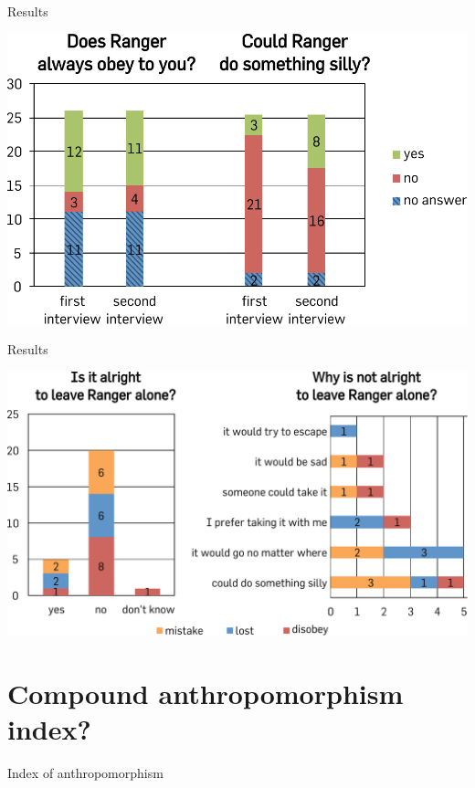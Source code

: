 \documentclass[compress]{beamer}
\begin{document}
\begin{frame}{Results}
    \begin{center}
    \includegraphics[height=0.6\textheight]{domino-intention}
    \end{center}
\end{frame}

\begin{frame}{Results}
    \begin{center}
    \includegraphics[height=0.6\textheight]{domino-leave-why}
    \end{center}
\end{frame}

\section{Compound anthropomorphism index?}

\begin{frame}{Index of anthropomorphism}
\end{frame}
\end{document}
